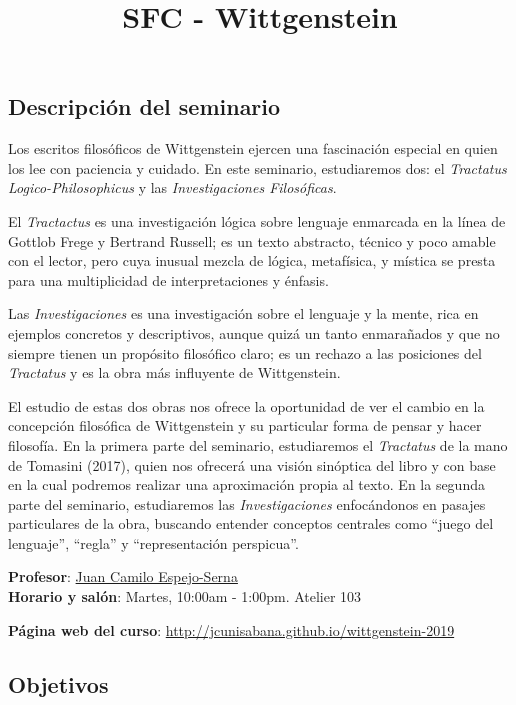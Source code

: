 \documentclass[spanish,]{article}
\title{SFC - Wittgenstein}
\author{}
\date{}
\begin{document}
\maketitle

\subsection{Descripción del seminario}\label{descripcion-del-seminario}

Los escritos filosóficos de Wittgenstein ejercen una fascinación
especial en quien los lee con paciencia y cuidado. En este seminario,
estudiaremos dos: el \emph{Tractatus Logico-Philosophicus} y las
\emph{Investigaciones Filosóficas}.

El \emph{Tractactus} es una investigación lógica sobre lenguaje
enmarcada en la línea de Gottlob Frege y Bertrand Russell; es un texto
abstracto, técnico y poco amable con el lector, pero cuya inusual mezcla
de lógica, metafísica, y mística se presta para una multiplicidad de
interpretaciones y énfasis.

Las \emph{Investigaciones } es una investigación sobre el lenguaje y la
mente, rica en ejemplos concretos y descriptivos, aunque quizá un tanto
enmarañados y que no siempre tienen un propósito filosófico claro; es un
rechazo a las posiciones del \emph{Tractatus} y es la obra más
influyente de Wittgenstein.

El estudio de estas dos obras nos ofrece la oportunidad de ver el cambio
en la concepción filosófica de Wittgenstein y su particular forma de
pensar y hacer filosofía. En la primera parte del seminario,
estudiaremos el \emph{Tractatus} de la mano de Tomasini (2017), quien
nos ofrecerá una visión sinóptica del libro y con base en la cual
podremos realizar una aproximación propia al texto. En la segunda parte
del seminario, estudiaremos las \emph{Investigaciones} enfocándonos en
pasajes particulares de la obra, buscando entender conceptos centrales
como ``juego del lenguaje'', ``regla'' y ``representación perspicua''.

\textbf{Profesor}: \href{../index.html}{Juan Camilo Espejo-Serna}\\
\textbf{Horario y salón}: Martes, 10:00am - 1:00pm. Atelier 103

\textbf{Página web del curso}:
\url{http://jcunisabana.github.io/wittgenstein-2019}

\subsection{Objetivos}\label{objetivos}
\end{document}
